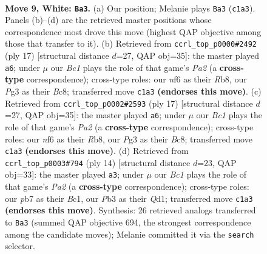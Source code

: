 \documentclass[11pt]{article}
\begin{document}
\clearpage

\begin{figure}[p]\centering
\begin{subfigure}{0.46\textwidth}\centering
\resizebox{\linewidth}{!}{%
\newchessgame
\chessboard[
  setfen={r1bq1rk1/pp1p1pb1/2n2np1/2p1p2p/2P4P/1PN2NP1/P2PPPB1/R1BQ1RK1 w - - 0 9},
  showmover=false,
  pgfstyle=straightmove, color=movearrow, markmove={c1-a3}
]}
\caption{}
\end{subfigure}\hfill
\begin{subfigure}{0.46\textwidth}\centering
\resizebox{\linewidth}{!}{%
\newchessgame
\chessboard[
  setfen={1rbq1rk1/pp2ppbp/2np1np1/2p5/P3PP2/2NP1NP1/1PP3BP/R1BQ1RK1 b - - 0 9},
  showmover=false,
  pgfstyle=straightmove, color=movearrow, markmove={a7-a6}
]}
\caption{}
\end{subfigure}
\\[4pt]
\begin{subfigure}{0.46\textwidth}\centering
\resizebox{\linewidth}{!}{%
\newchessgame
\chessboard[
  setfen={1rbq1rk1/pp2ppbp/2np1np1/2p5/P3PP2/2NP1NP1/1PP3BP/R1BQ1RK1 b - - 0 9},
  showmover=false,
  pgfstyle=straightmove, color=movearrow, markmove={a7-a6}
]}
\caption{}
\end{subfigure}\hfill
\begin{subfigure}{0.46\textwidth}\centering
\resizebox{\linewidth}{!}{%
\newchessgame
\chessboard[
  setfen={r1bq1rk1/pp2bppp/2np1n2/2p1p3/2P5/2NP1NP1/PP2PPBP/R1BQ1RK1 w - - 4 8},
  showmover=false,
  pgfstyle=straightmove, color=movearrow, markmove={a2-a3}
]}
\caption{}
\end{subfigure}
\caption{\textbf{Move 9, White: \texttt{Ba3}.} (a) Our position; Melanie plays \texttt{Ba3} (\texttt{c1a3}). Panels (b)--(d) are the retrieved master positions whose correspondence most drove this move (highest QAP objective among those that transfer to it). (b) Retrieved from \texttt{ccrl\_top\_p0000\#2492} (ply 17) [structural distance $d$=27, QAP obj=35]: the master played \texttt{a6}; under $\mu$ our \emph{Bc1} plays the role of that game's \emph{Pa2} (a \textbf{cross-type} correspondence); cross-type roles: our \emph{n}f6 as their \emph{R}b8, our \emph{P}g3 as their \emph{B}c8; transferred move \texttt{c1a3} \textbf{(endorses this move)}. (c) Retrieved from \texttt{ccrl\_top\_p0002\#2593} (ply 17) [structural distance $d$=27, QAP obj=35]: the master played \texttt{a6}; under $\mu$ our \emph{Bc1} plays the role of that game's \emph{Pa2} (a \textbf{cross-type} correspondence); cross-type roles: our \emph{n}f6 as their \emph{R}b8, our \emph{P}g3 as their \emph{B}c8; transferred move \texttt{c1a3} \textbf{(endorses this move)}. (d) Retrieved from \texttt{ccrl\_top\_p0003\#794} (ply 14) [structural distance $d$=23, QAP obj=33]: the master played \texttt{a3}; under $\mu$ our \emph{Bc1} plays the role of that game's \emph{Pa2} (a \textbf{cross-type} correspondence); cross-type roles: our \emph{p}b7 as their \emph{B}c1, our \emph{P}b3 as their \emph{Q}d1; transferred move \texttt{c1a3} \textbf{(endorses this move)}. Synthesis: 26 retrieved analogs transferred to \texttt{Ba3} (summed QAP objective 694, the strongest correspondence among the candidate moves); Melanie committed it via the \texttt{search} selector.}

\end{figure}
\end{document}

